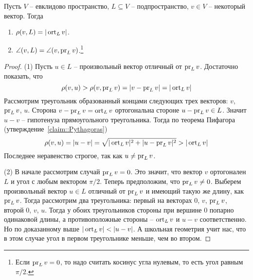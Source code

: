 \begin{claim}\label{claim::DistAngle}
Пусть $V$ -- евклидово пространство, $L\subseteq V$ -- подпространство, $v\in V$ -- некоторый вектор. Тогда
\begin{enumerate}
\item $\rho(v, L) = |\operatorname{ort}_L v|$.
\item $\angle(v, L) = \angle(v, \operatorname{pr}_L v)$.\footnote{Если $\operatorname{pr}_L v = 0$, то надо считать косинус угла нулевым, то есть угол равным $\pi/2$.}
\end{enumerate}
\end{claim}
\begin{proof}
(1) Пусть $u\in L$ -- произвольный вектор отличный от $\operatorname{pr}_L v$. Достаточно показать, что 
\[
\rho(v, u) > \rho (v, \operatorname{pr}_Lv) = |v - \operatorname{pr}_Lv| = |\operatorname{ort}_L v|
\]
Рассмотрим треугольник образованный концами следующих трех векторов: $v$, $\operatorname{pr}_Lv$, $u$. Сторона $v - \operatorname{pr}_Lv = \operatorname{ort}_L v$ ортогональна стороне $u - \operatorname{pr}_L v \in L$. Значит $u - v$ -- гипотенуза прямоугольного треугольника. Тогда по теорема Пифагора (утверждение~\ref{claim::Pythagoras})
\[
\rho(v,u) = |u - v| = \sqrt{|\operatorname{ort}_Lv|^2 + |u - \operatorname{pr}_Lv|^2 }> |\operatorname{ort}_Lv|
\]
Последнее неравенство строгое, так как $u\neq \operatorname{pr}_Lv$.

(2) В начале рассмотрим случай $\operatorname{pr}_L v = 0$. Это значит, что вектор $v$ ортогонален $L$ и угол с любым вектором $\pi/2$. Теперь предположим, что $\operatorname{pr}_L v \neq 0$. Выберем произвольный вектор $u\in L$ отличный от $\operatorname{pr}_L v$ и имеющий такую же длину, как $\operatorname{pr}_L v$. Тогда рассмотрим два треугольника: первый на векторах $0$, $v$, $\operatorname{pr}_Lv$, второй $0$, $v$, $u$. Тогда у обоих треугольников стороны при вершине $0$ попарно одинаковой длины, а противоположные стороны -- $\operatorname{ort}_L v$ и $u - v$ соответственно. Но по доказанному выше $|\operatorname{ort}_L v| < |u - v|$. А школьная геометрия учит нас, что в этом случае угол в первом треугольнике меньше, чем во втором.


\end{proof}
